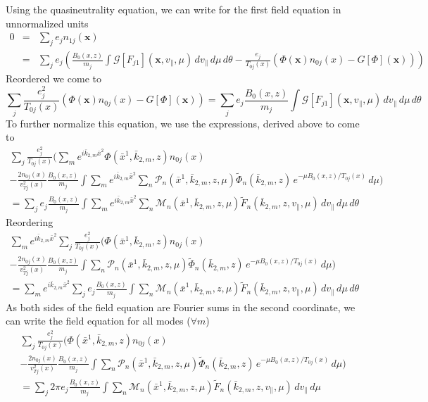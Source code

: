 Using the quasineutrality equation, we can write for the first field
equation in unnormalized units
\begin{eqnarray*}
  0 &=&\sum_j e_jn_{1j}(\mathbf{x})\\
  &=&\sum_j e_j \left(
    \frac{B_0(x,z)}{m_j}\int \mathcal{G}[F_{j1}](\mathbf{x},v_\|,\mu)\,dv_\|\,d\mu\,d\theta
    -\frac{e_j}{T_{0j}(x)}\left(
      \Phi(\mathbf{x}) n_{0j}(x)
      -G[\Phi](\mathbf{x})
    \right)  
  \right)
\end{eqnarray*}
Reordered we come to
\begin{displaymath}
  \sum_j\frac{e_j^2}{T_{0j}(x)}\left(
    \Phi(\mathbf{x}) n_{0j}(x)
    -G[\Phi](\mathbf{x})
  \right) 
  = \sum_je_j\frac{B_0(x,z)}{m_j}\int \mathcal{G}[F_{j1}](\mathbf{x},v_\|,\mu)\,dv_\|\,d\mu\,d\theta
\end{displaymath}
To further normalize this equation, we use the expressions, derived
above to come to
\begin{multline*}
  \sum_j\frac{e_j^2}{T_{0j}(x)}\Bigg(
    \sum_m e^{i\bar k_{2,m}\bar x^2} \Phi(\bar{x}^1,\bar{k}_{2,m},z) n_{0j}(x)\\
    -\frac{2n_{0j}(x)}{v_{Tj}^2(x)}\frac{B_0(x,z)}{m_j}
    \int \sum_m e^{i\bar k_{2,m}\bar x^2} \sum_n \mathcal{P}_n(\bar{x}^1,\bar{k}_{2,m},z,\mu) \tilde{\Phi}_{n}(\bar{k}_{2,m},z)
    \,e^{-\mu B_0(x,z)/T_{0j}(x)}\,d\mu
  \Bigg) \\
  = \sum_j e_j\frac{B_0(x,z)}{m_j}\int \sum_m e^{i\bar{k}_{2,m}\bar{x}^2}
  \sum_n\mathcal{M}_n(\bar{x}^1,\bar{k}_{2,m},z,\mu)\tilde{F}_n(\bar{k}_{2,m},z,v_\|,\mu)\,dv_\|\,d\mu\,d\theta
\end{multline*}
Reordering
\begin{multline*}
  \sum_m e^{i\bar k_{2,m}\bar x^2} \sum_j\frac{e_j^2}{T_{0j}(x)}\Bigg(
    \Phi(\bar{x}^1,\bar{k}_{2,m},z) n_{0j}(x)\\
    -\frac{2n_{0j}(x)}{v_{Tj}^2(x)}\frac{B_0(x,z)}{m_j}
    \int  \sum_n \mathcal{P}_n(\bar{x}^1,\bar{k}_{2,m},z,\mu) \tilde{\Phi}_{n}(\bar{k}_{2,m},z)
    \,e^{-\mu B_0(x,z)/T_{0j}(x)}\,d\mu
  \Bigg) \\
  = \sum_m e^{i\bar{k}_{2,m}\bar{x}^2} \sum_j e_j\frac{B_0(x,z)}{m_j}\int 
  \sum_n\mathcal{M}_n(\bar{x}^1,\bar{k}_{2,m},z,\mu)\tilde{F}_n(\bar{k}_{2,m},z,v_\|,\mu)\,dv_\|\,d\mu\,d\theta
\end{multline*}
As both sides of the field equation are Fourier sums in the second
coordinate, we can write the field equation for all modes
($\forall m$)
\begin{multline*}
  \sum_j\frac{e_j^2}{T_{0j}(x)}\Bigg(
    \Phi(\bar{x}^1,\bar{k}_{2,m},z) n_{0j}(x)\\
    -\frac{2n_{0j}(x)}{v_{Tj}^2(x)}\frac{B_0(x,z)}{m_j}
    \int  \sum_n \mathcal{P}_n(\bar{x}^1,\bar{k}_{2,m},z,\mu) \tilde{\Phi}_{n}(\bar{k}_{2,m},z)
    \,e^{-\mu B_0(x,z)/T_{0j}(x)}\,d\mu
  \Bigg) \\
  = \sum_j 2\pi e_j\frac{B_0(x,z)}{m_j}\int 
  \sum_n\mathcal{M}_n(\bar{x}^1,\bar{k}_{2,m},z,\mu)\tilde{F}_n(\bar{k}_{2,m},z,v_\|,\mu)\,dv_\|\,d\mu
\end{multline*}
